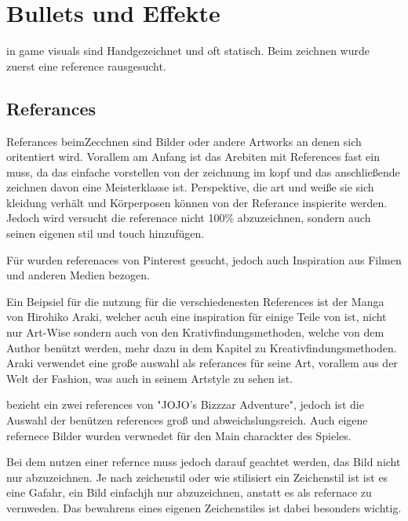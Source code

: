 
\section{Bullets und Effekte}\label{sec:bullets-und-effekte}

\renewcommand{\kapitelautor}{Autor: Irgendwer} %


\FF in game visuals sind Handgezeichnet und oft statisch. Beim zeichnen wurde zuerst eine reference rausgesucht.


\subsection{Referances}\label{subsec:references}
Referances beimZecchnen sind Bilder oder andere Artworks an denen sich oritentiert wird. Vorallem am Anfang ist das
Arebiten mit References fast ein muss, da das einfache vorstellen von der zeichnung im kopf und das anschließende zeichnen davon eine Meisterklasse ist.
Perspektive, die art und weiße sie sich kleidung verhält und Körperposen können von der Referance inspierite werden.
Jedoch wird versucht die referenace nicht 100\% abzuzeichnen, sondern auch seinen eigenen stil und touch hinzufügen. 


Für \FF wurden referenaces von Pinterest gesucht, jedoch auch Inspiration aus Filmen und anderen Medien bezogen.


Ein Beipsiel für die nutzung für die verschiedenesten References ist der Manga  von Hirohiko Araki,
welcher acuh eine inspiration für einige Teile von \FF ist, nicht nur Art-Wise sondern auch von den Krativfindungsmethoden, welche von dem Author benützt werden, mehr dazu in dem
Kapitel zu Kreativfindungsmethoden. %
Araki verwendet eine große auswahl als referances für seine Art, vorallem aus der Welt
der Fashion, was auch in seinem Artstyle zu sehen ist.


\FF bezieht ein zwei references von "JOJO's Bizzzar Adventure", jedoch ist die Auswahl der benützen references groß und abweichslungsreich.
Auch eigene refernece Bilder wurden verwnedet für den Main charackter des Spieles.


Bei dem nutzen einer refernce muss jedoch darauf geachtet werden, das Bild nicht nur abzuzeichnen. Je nach zeichenstil
oder wie stilisiert ein Zeichenstil ist ist es eine Gafahr, ein  Bild einfachjh nur abzuzeichnen, anstatt es als refernace zu vernweden.
Das bewahrens eines eigenen Zeichenstiles ist dabei besonders wichtig.


